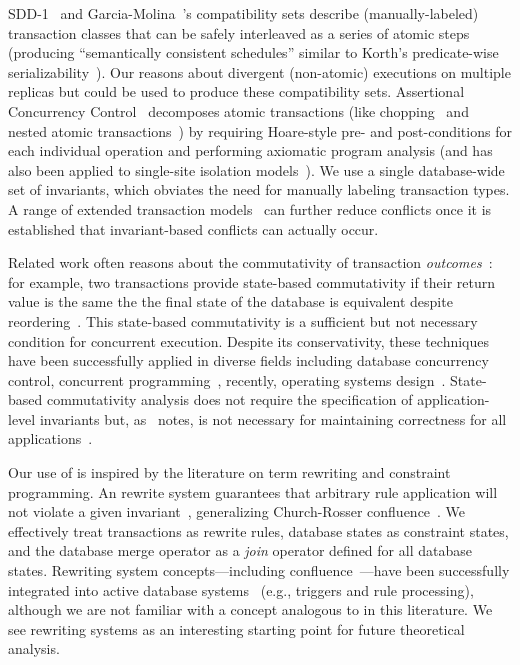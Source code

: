 SDD-1~\cite{sdd1} and Garcia-Molina~\cite{garciamolina-semantics}'s
compatibility sets describe (manually-labeled) transaction classes
that can be safely interleaved as a series of atomic steps (producing
``semantically consistent schedules'' similar to Korth's
predicate-wise serializability~\cite{korth-serializability}). Our
\iconfluence reasons about divergent (non-atomic) executions on
multiple replicas but could be used to produce these compatibility
sets. Assertional Concurrency Control~\cite{decomp-semantics}
decomposes atomic transactions (like chopping~\cite{chopping} and
nested atomic transactions~\cite{atomictransactions}) by requiring
Hoare-style pre- and post-conditions for each individual operation and
performing axiomatic program analysis (and has also been applied to
single-site isolation models~\cite{isolation-semantics}). We use a
single database-wide set of invariants, which obviates the need for
manually labeling transaction types. A range of extended transaction
models~\cite{acta} can further reduce conflicts once it is established
that invariant-based conflicts can actually occur.

 Related work often reasons about
the commutativity of transaction \textit{outcomes}~\cite{boosting}:
for example, two transactions provide state-based commutativity if
their return value is the same the the final state of the database is
equivalent despite reordering~\cite{weihl-data,weihl-thesis}. This
state-based commutativity is a sufficient but not necessary condition
for concurrent execution. Despite its conservativity, these techniques
have been successfully applied in diverse fields including database
concurrency control, concurrent programming~\cite{boosting}, recently,
operating systems design~\cite{kohler-commutativity}. State-based
commutativity analysis does not require the specification of
application-level invariants but, as~\cite{kohler-commutativity}
notes, is not necessary for maintaining correctness for all
applications~\cite{lamport-audit}.

 Our use of \iconfluence is inspired by the
literature on term rewriting and constraint programming. An
\iconfluent rewrite system guarantees that arbitrary rule application
will not violate a given invariant~\cite{obs-confluence}, generalizing
Church-Rosser confluence~\cite{termrewriting}. We effectively treat
transactions as rewrite rules, database states as constraint states,
and the database merge operator as a \textit{join} operator defined
for all database states.  Rewriting system concepts---including
confluence~\cite{aiken-confluence}---have been successfully integrated
into active database systems~\cite{activedb-book} (e.g., triggers and
rule processing), although we are not familiar with a concept
analogous to \iconfluence in this literature. We see rewriting systems
as an interesting starting point for future theoretical analysis.

